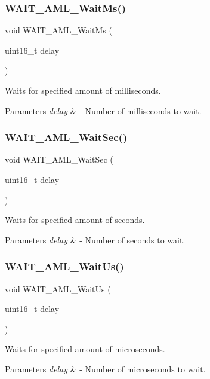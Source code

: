 \subsubsection{\texorpdfstring{WAIT\_AML\_WaitMs()}{WAIT\_AML\_WaitMs()}}
{\footnotesize\ttfamily void W\+A\+I\+T\+\_\+\+A\+M\+L\+\_\+\+Wait\+Ms (\begin{DoxyParamCaption}\item[{uint16\+\_\+t}]{delay }\end{DoxyParamCaption})}



Waits for specified amount of milliseconds. 


\begin{DoxyParams}{Parameters}
{\em delay} & -\/ Number of milliseconds to wait. \\
\hline
\end{DoxyParams}
\mbox{\label{group__function__group_ga2cc4c9ff3ce6add5f7d02798bebb1939}} 
\subsubsection{\texorpdfstring{WAIT\_AML\_WaitSec()}{WAIT\_AML\_WaitSec()}}
{\footnotesize\ttfamily void W\+A\+I\+T\+\_\+\+A\+M\+L\+\_\+\+Wait\+Sec (\begin{DoxyParamCaption}\item[{uint16\+\_\+t}]{delay }\end{DoxyParamCaption})}



Waits for specified amount of seconds. 


\begin{DoxyParams}{Parameters}
{\em delay} & -\/ Number of seconds to wait. \\
\hline
\end{DoxyParams}
\mbox{\label{group__function__group_gac71523b2fdbddc5d35c018502abbd770}} 
\subsubsection{\texorpdfstring{WAIT\_AML\_WaitUs()}{WAIT\_AML\_WaitUs()}}
{\footnotesize\ttfamily void W\+A\+I\+T\+\_\+\+A\+M\+L\+\_\+\+Wait\+Us (\begin{DoxyParamCaption}\item[{uint16\+\_\+t}]{delay }\end{DoxyParamCaption})}



Waits for specified amount of microseconds. 


\begin{DoxyParams}{Parameters}
{\em delay} & -\/ Number of microseconds to wait. \\
\hline
\end{DoxyParams}
